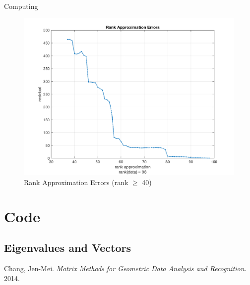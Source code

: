 \begin{section}{Computing}
{    \begin{minipage}{1.0\textwidth}
        \begin{figure}[H]
        \centering
        \includegraphics[trim={0cm 0cm 0cm 0cm},clip,width=0.85\columnwidth]{../data/approx_errors}
        \caption{Rank Approximation Errors (rank $\geq$ 40)}
        \label{fig:approx_errors}
        \end{figure}
    \end{minipage}
}

\end{section}

\newpage

\appendix

\section{Code}\label{code}

\subsection{Eigenvalues and Vectors} \label{code:eigvalvec}



\begin{thebibliography}{10}
    Chang, Jen-Mei. \textit{Matrix Methods for Geometric Data Analysis and Recognition}. 2014.

\end{thebibliography}


